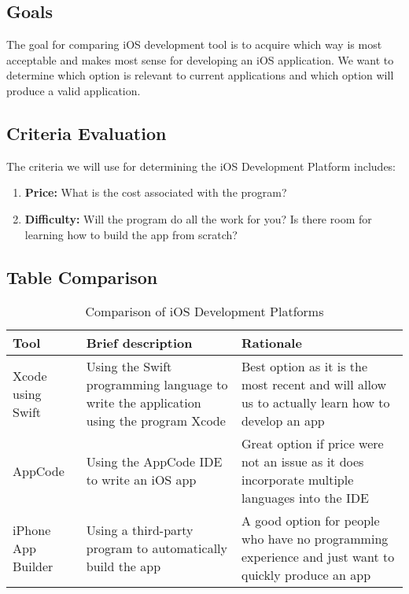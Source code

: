 \documentclass[letterpaper,10pt,draftclsnofoot,onecolumn,titlepage]{IEEEtran}
\begin{document}
	\subsection{Goals}
	The goal for comparing iOS development tool is to acquire which way is most acceptable and makes most sense for developing an iOS application.
	We want to determine which option is relevant to current applications and which option will produce a valid application.
	\subsection{Criteria Evaluation}
	The criteria we will use for determining the iOS Development Platform includes: 
		\begin{enumerate}
			\item \textbf{Price:} What is the cost associated with the program?
			\item \textbf{Difficulty:} Will the program do all the work for you? Is there room for learning how to build the app from scratch?
		\end{enumerate}
	\subsection{Table Comparison}

	\begin{table}[ht]
	\caption{Comparison of iOS Development Platforms}
	\begin{center}
	\begin{tabular} { | m{3cm} | m{5cm} | m{5cm} | }
	\hline\hline
	Tool & Brief description & Rationale \\ [0.5ex]
	\hline
	Xcode using Swift & Using the Swift programming language to write the application using the program Xcode & Best option as it is the most recent and will allow us to actually learn how to develop an app \\
	\hline
	AppCode & Using the AppCode IDE to write an iOS app & Great option if price were not an issue as it does incorporate multiple languages into the IDE \\
	\hline
	iPhone App Builder & Using a third-party program to automatically build the app & A good option for people who have no programming experience and just want to quickly produce an app \\
	\hline
	\end{tabular}
	\end{center}
	\end{table}
\end{document}
